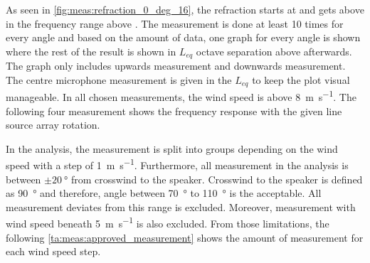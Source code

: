 
As seen in \autoref{fig:meas:refraction_0_deg_16}, the refraction starts at  and gets above  in the frequency range above . The measurement is done at least 10 times for every angle and based on the amount of data, one graph for every angle is shown where the rest of the result is shown in $L_{eq}$ octave separation above  afterwards. The graph only includes upwards measurement and downwards measurement. The centre microphone measurement is given in the $L_{eq}$  to keep the plot visual manageable. In all chosen measurements, the wind speed is above \SI{8}{\meter\per\second}. The following four measurement shows the frequency response with the given line source array rotation.


In the analysis, the measurement is split into groups depending on the wind speed with a step of \SI{1}{\meter\per\second}. Furthermore, all measurement in the analysis is between $\pm\SI{20}{\degree}$ from crosswind to the speaker. Crosswind to the speaker is defined as \SI{90}{\degree} and therefore, angle between \SI{70}{\degree} to \SI{110}{\degree} is the acceptable. All measurement deviates from this range is excluded. Moreover, measurement with wind speed beneath \SI{5}{\meter\per\second} is also excluded. From those limitations, the following \autoref{ta:meas:approved_measurement} shows the amount of measurement for each wind speed step. 

